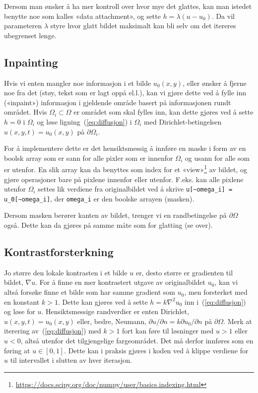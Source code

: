 \documentclass[11pt,a4paper]{article}
\begin{document}
Dersom man ønsker å ha mer kontroll over hvor mye det glattes, kan man istedet benytte noe som kalles «data attachment», og sette $h = \lambda(u - u_0)$. Da vil parameteren $\lambda$ styre hvor glatt bildet maksimalt kan bli selv om det itereres ubegrenset lenge.

\subsection{Inpainting}
\label{sec:inpainting}

Hvis vi enten mangler noe informasjon i et bilde $u_0(x, y)$, eller ønsker å fjerne noe fra det (støy, tekst som er lagt oppå el.l.), kan vi gjøre dette ved å fylle inn («inpaint») informasjon i gjeldende område basert på informasjonen rundt området. Hvis $\Omega_i \subset \Omega$ er området som skal fylles inn, kan dette gjøres ved å sette $h = 0$ i $\Omega_i$ og løse ligning~(\ref{eq:diffusjon}) i $\Omega_i$ med Dirichlet-betingelsen $u(x, y, t) = u_0(x, y)$ på $\partial\Omega_i$.

For å implementere dette er det hensiktsmessig å innføre en maske i form av en boolsk array som er sann for alle pixler som er innenfor $\Omega_i$ og usann for alle som er utenfor. En slik array kan da benyttes som index for et «view»\footnote{\url{https://docs.scipy.org/doc/numpy/user/basics.indexing.html}} av bildet, og gjøre operasjoner bare på pixlene innenfor eller utenfor. F.eks. kan alle pixlene utenfor $\Omega_i$ settes lik verdiene fra originalbildet ved å skrive \texttt{u[\textasciitilde   omega\_i] = u\_0[\textasciitilde omega\_i]}, der \texttt{omega\_i} er den boolske arrayen (masken).

Dersom masken berører kanten av bildet, trenger vi en randbetingelse på $\partial\Omega$ også. Dette kan da gjøres på samme måte som for glatting (se over).

\subsection{Kontrastforsterkning}
\label{sec:kontrastforsterkning}

Jo større den lokale kontrasten i et bilde $u$ er, desto større er gradienten til bildet, $\nabla u$. For å finne en mer kontrastert utgave av originalbildet $u_0$, kan vi altså forsøke finne et bilde som har samme gradient som $u_0$, men forsterket med en konstant $k > 1$. Dette kan gjøres ved å sette $h = k\nabla^2 u_0$ inn i~(\ref{eq:diffusjon}) og løse for $u$. Hensiktsmessige randverdier er enten Dirichlet, $u(x, y, t) = u_0(x, y)$ eller, bedre, Neumann, $\partial u/\partial n = k\partial u_0/\partial n$ på $\partial\Omega$. Merk at iterering av~(\ref{eq:diffusjon}) med $k > 1$ fort kan føre til løsninger med $u > 1$ eller $u < 0$, altså utenfor det tilgjengelige fargeområdet. Det må derfor innføres som en føring at $u \in [0, 1]$. Dette kan i praksis gjøres i koden ved å klippe verdiene for $u$ til intervallet i slutten av hver iterasjon.
\end{document}
